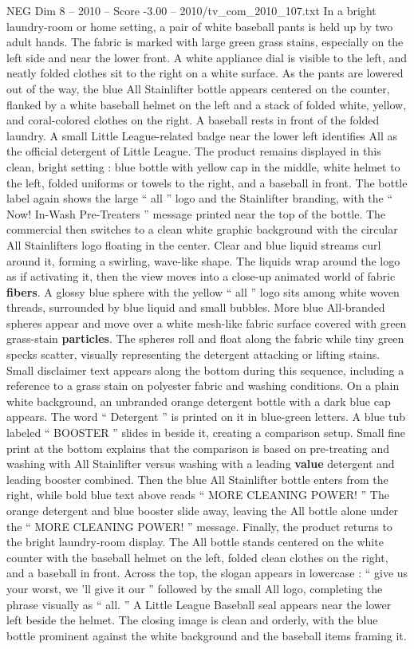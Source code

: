 \begin{textsample}{NEG Dim 8 – 2010 – Score -3.00 – 2010/tv\_com\_2010\_107.txt}
In a bright laundry-room or home setting, a pair of white baseball pants is held up by two adult hands.
The fabric is marked with large green grass stains, especially on the left side and near the lower front.
A white appliance dial is visible to the left, and neatly folded clothes sit to the right on a white surface.
As the pants are lowered out of the way, the blue All Stainlifter bottle appears centered on the counter, flanked by a white baseball helmet on the left and a stack of folded white, yellow, and coral-colored clothes on the right.
A baseball rests in front of the folded laundry.
A small Little League-related badge near the lower left identifies All as the official detergent of Little League.
The product remains displayed in this clean, bright setting : blue bottle with yellow cap in the middle, white helmet to the left, folded uniforms or towels to the right, and a baseball in front.
The bottle label again shows the large “ all ” logo and the Stainlifter branding, with the “ Now!
In-Wash Pre-Treaters ” message printed near the top of the bottle.
The commercial then switches to a clean white graphic background with the circular All Stainlifters logo floating in the center.
Clear and blue liquid streams curl around it, forming a swirling, wave-like shape.
The liquids wrap around the logo as if activating it, then the view moves into a close-up animated world of fabric \textbf{fibers}.
A glossy blue sphere with the yellow “ all ” logo sits among white woven threads, surrounded by blue liquid and small bubbles.
More blue All-branded spheres appear and move over a white mesh-like fabric surface covered with green grass-stain \textbf{particles}.
The spheres roll and float along the fabric while tiny green specks scatter, visually representing the detergent attacking or lifting stains.
Small disclaimer text appears along the bottom during this sequence, including a reference to a grass stain on polyester fabric and washing conditions.
On a plain white background, an unbranded orange detergent bottle with a dark blue cap appears.
The word “ Detergent ” is printed on it in blue-green letters.
A blue tub labeled “ BOOSTER ” slides in beside it, creating a comparison setup.
Small fine print at the bottom explains that the comparison is based on pre-treating and washing with All Stainlifter versus washing with a leading \textbf{value} detergent and leading booster combined.
Then the blue All Stainlifter bottle enters from the right, while bold blue text above reads “ MORE CLEANING POWER! ” The orange detergent and blue booster slide away, leaving the All bottle alone under the “ MORE CLEANING POWER! ” message.
Finally, the product returns to the bright laundry-room display.
The All bottle stands centered on the white counter with the baseball helmet on the left, folded clean clothes on the right, and a baseball in front.
Across the top, the slogan appears in lowercase : “ give us your worst, we ’ll give it our ” followed by the small All logo, completing the phrase visually as “ all. ” A Little League Baseball seal appears near the lower left beside the helmet.
The closing image is clean and orderly, with the blue bottle prominent against the white background and the baseball items framing it.

\end{textsample}
